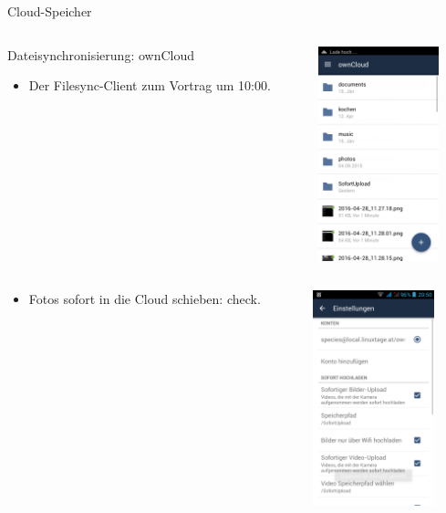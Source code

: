 \documentclass{beamer}
\begin{document}
\begin{frame}{Cloud-Speicher}

\begin{columns}[c]
  \begin{column}[T]{.7\textwidth}

    \vspace{0.5cm}
    Dateisynchronisierung: ownCloud
    \vspace{0.5cm}

    \begin{itemize}
      \item Der Filesync-Client zum Vortrag um 10:00.
    \end{itemize}
  \end{column}
  \begin{column}[T]{.3\textwidth}
    \includegraphics[width=3.5cm]{owncloud.png} 
   \end{column}
\end{columns}

        \pause

\begin{columns}[c]
  \begin{column}[T]{.7\textwidth}

    \vspace{-2cm}
      \begin{itemize}
        \item Fotos sofort in die Cloud schieben: check.
      \end{itemize}
   \end{column}
  \begin{column}[T]{.3\textwidth}
    \vspace{-6.1cm}
    \includegraphics[width=3.5cm]{owncloud-upload.png} 
   \end{column}
\end{columns}

\end{frame}
\end{document}
